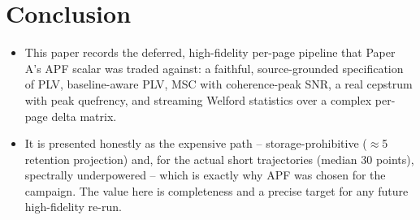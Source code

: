 \documentclass[conference]{IEEEtran}
\begin{document}
\section{Conclusion}
\begin{itemize}
  \item This paper records the deferred, high-fidelity per-page pipeline that
        Paper A's APF scalar was traded against: a faithful, source-grounded
        specification of PLV, baseline-aware PLV, MSC with coherence-peak SNR,
        a real cepstrum with peak quefrency, and streaming Welford statistics
        over a complex per-page delta matrix.
  \item It is presented honestly as the expensive path -- storage-prohibitive
        ($\approx$\SI{5}{\tebi\byte} retention projection) and, for the actual
        short trajectories (median \num{30} points), spectrally underpowered --
        which is exactly why APF was chosen for the campaign. The value here is
        completeness and a precise target for any future high-fidelity re-run.
\end{itemize}



\end{document}
